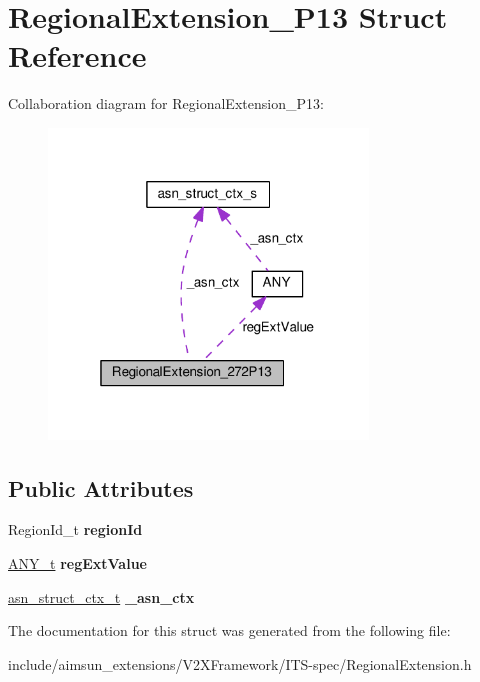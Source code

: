 \hypertarget{structRegionalExtension__272P13}{}\section{Regional\+Extension\+\_\+P13 Struct Reference}
\label{structRegionalExtension__272P13}


Collaboration diagram for Regional\+Extension\+\_\+P13\+:\nopagebreak
\begin{figure}[H]
\begin{center}
\leavevmode
\includegraphics[width=241pt]{structRegionalExtension__272P13__coll__graph}
\end{center}
\end{figure}
\subsection*{Public Attributes}
\begin{DoxyCompactItemize}
\item 
Region\+Id\+\_\+t {\bfseries region\+Id}\hypertarget{structRegionalExtension__272P13_ab020bd4dec7dd547a0bdb20ee08777ad}{}\label{structRegionalExtension__272P13_ab020bd4dec7dd547a0bdb20ee08777ad}

\item 
\hyperlink{structANY}{A\+N\+Y\+\_\+t} {\bfseries reg\+Ext\+Value}\hypertarget{structRegionalExtension__272P13_a8c9fc7a0a8d3d830041c808d5201d66d}{}\label{structRegionalExtension__272P13_a8c9fc7a0a8d3d830041c808d5201d66d}

\item 
\hyperlink{structasn__struct__ctx__s}{asn\+\_\+struct\+\_\+ctx\+\_\+t} {\bfseries \+\_\+asn\+\_\+ctx}\hypertarget{structRegionalExtension__272P13_a72bd545cdb60762c7e00837dd7997b0b}{}\label{structRegionalExtension__272P13_a72bd545cdb60762c7e00837dd7997b0b}

\end{DoxyCompactItemize}


The documentation for this struct was generated from the following file\+:\begin{DoxyCompactItemize}
\item 
include/aimsun\+\_\+extensions/\+V2\+X\+Framework/\+I\+T\+S-\/spec/Regional\+Extension.\+h\end{DoxyCompactItemize}
